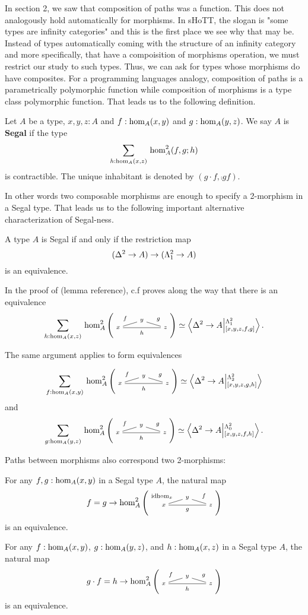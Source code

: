 \documentclass[main.tex]{subfiles}
\begin{document}
In section 2, we saw that composition of paths was a function. This does not analogously hold automatically for morphisms. In sHoTT,
the slogan is "some types are infinity categories" and this is the first place we see why that may be. Instead of types automatically
coming with the structure of an infinity category and more specifically, that have a compoisition of morphisms operation, we must
restrict our study to such types. Thus, we can ask for types whose morphisms do have composites. For a programming languages analogy, 
composition of paths is a parametrically polymorphic function while composition of morphisms is a type class polymorphic function.
That leads us to the following definition.
\begin{definition}\label{def:def3.3}
    Let $A$ be a type, $x,y,z : A$ and $f : \ho[A]{x}{y}$ and $g : \ho[A]{y}{z}$. We say $A$ is \textbf{Segal} if the type $${\sm{h : \ho[A]{x}{z}} \hot[A]{f}{g}{h}} $$
    is contractible. The unique inhabitant is denoted by $(g\cdot f, \comp{g}{f}).$
\end{definition}

In other words two composable morphisms are enough to specify a 2-morphism in a Segal type. That leads us to the following important alternative characterization of Segal-ness.

\begin{lemma}
A type $A$ is Segal if and only if the restriction map
$$
(\tsx \to A) \to (\tohorn \to A) 
$$
is an equivalence. 
\end{lemma}
\begin{remark}
    In the proof of (lemma reference), c.f proves along the way that there is an equivalence
    \begin{equation}
        \sm{h : \ho[A]{x}{z}}\homtwo{A}(x,y,z,f,g,h) \simeq \ndexten{\tsx}{A}{\tohorn}{[x,y,z,f,g]}.
    \end{equation}

    \noindent The same argument applies to form equivalences 

    \begin{equation}
        \label{rem:sumoverfistt}
    \sm{f : \ho[A]{x}{y}}\homtwo{A}(x,y,z,f,g,h) \simeq \ndexten{\tsx}{A}{\tthorn}{[x,y,z,g,h]}
    \end{equation}
    and
    \begin{equation}
    \sm{g : \ho[A]{y}{z}}\homtwo{A}(x,y,z,f,g,h) \simeq \ndexten{\tsx}{A}{\tzhorn}{[x,y,z,f,h]}.
    \end{equation}
\end{remark}
Paths between morphisms also correspond two 2-morphisms:
\begin{lemma}
    \label{lem:pathis2mor}
    For any $f,g : \ho[A]{x}{y}$ in a Segal type $A$, the natural map
    $$f = g \to \homtwo{A}(x,y,z, \idhom{x}, f,g)$$
    is an equivalence.
\end{lemma}
\begin{lemma}
    \label{lem:compequalis2mor}
    For any $f: \ho[A]{x}{y}$, $g : \ho[A]{y}{z}$, and $h : \ho[A]{x}{z}$ in a Segal type $A$, the natural map
    $$g \cdot f = h \to \homtwo{A}(x,y,z,f,g,h)$$
    is an equivalence.
\end{lemma}
\end{document}
